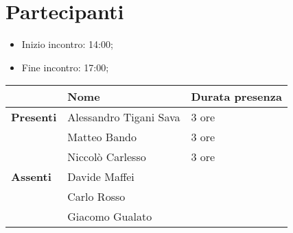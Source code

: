 \section{Partecipanti}

\begin{itemize}
    \item Inizio incontro: 14:00;
    \item Fine incontro: 17:00;
\end{itemize}


\begin{center}
{\renewcommand{\arraystretch}{1.5}
\begin{tabular}{lll}
	                    & \textbf{Nome}  & \textbf{Durata presenza} 	\\
	\hline
	\textbf{Presenti}   & Alessandro Tigani Sava	& 3 ore     \\
						& Matteo Bando				& 3 ore		\\
						& Niccolò Carlesso			& 3 ore		\\
	\hline
	\textbf{Assenti}	& Davide Maffei             &	        \\
						& Carlo Rosso				&			\\
						& Giacomo Gualato			&			\\
\end{tabular}	
}
\end{center}